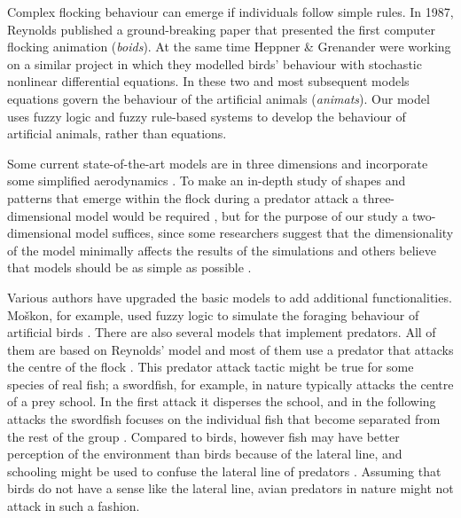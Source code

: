 Complex flocking behaviour can emerge if individuals follow simple rules. In 1987, Reynolds \cite{reynolds1987flocks} published a ground-breaking paper that presented the first computer flocking animation (\emph{boids}). At the same time Heppner \& Grenander \cite{heppner1990stochastic} were working on a similar project in which they modelled birds' behaviour with stochastic nonlinear differential equations. In these two and most subsequent models equations govern the behaviour of the artificial animals (\emph{animats}). Our model uses fuzzy logic \cite{zadeh1965fuzzy} and fuzzy rule-based systems \cite{mamdani1974application,dasilva2008predator} to develop the behaviour of artificial animals, rather than equations.

Some current state-of-the-art models are in three dimensions and incorporate some simplified aerodynamics \cite{hildenbrandt2010selforganized}. To make an in-depth study of shapes and patterns that emerge within the flock during a predator attack a three-dimensional model would be required \cite{hemelrijk2011somecauses}, but for the purpose of our study a two-dimensional model suffices, since some researchers suggest that the dimensionality of the model minimally affects the results of the simulations \cite{huth1992simulation,huth1994simulation,kunz2012simulations} and others believe that models should be as simple as possible \cite{czirok2000collective}.

Various authors have upgraded the basic models to add additional functionalities. Moškon\etal, for example, used fuzzy logic to simulate the foraging behaviour of artificial birds \cite{moskon2007fuzzy}. There are also several models that implement predators. All of them are based on Reynolds' model and most of them use a predator that attacks the centre of the flock \cite{inada2002order,lee2006dynamics}. This predator attack tactic
might be true for some species of real fish; a swordfish, for example, in nature typically attacks the centre of a prey school. In the first attack it disperses the school, and in the following attacks the swordfish focuses on the individual fish that become separated from the rest of the group \cite{stephens2003modelling}. Compared to birds, however fish may have better perception of the environment than birds because of the lateral line, and schooling might be used to confuse the lateral line of predators \cite{larsson2009possible}. Assuming that birds do not have a sense like the lateral line, avian predators in nature might not attack in such a fashion.


